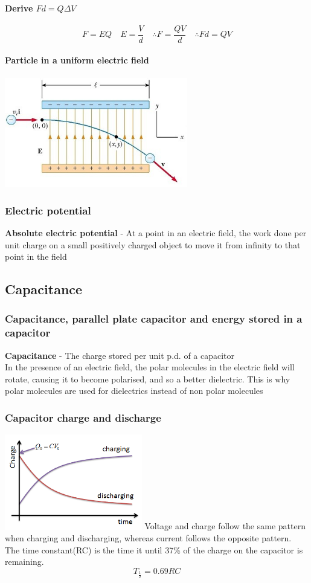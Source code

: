 \documentclass[12pt]{article}
\begin{document}
\paragraph{Derive $Fd=Q\Delta V$}
$$F=EQ \quad E=\frac{V}{d} \quad\therefore F=\frac{QV}{d} \quad\therefore Fd=QV$$
\paragraph{Particle in a uniform electric field}
\begin{center}
\includegraphics[width=8cm]{particle.jpg}
\end{center}
\subsubsection{Electric potential}
\textbf{Absolute electric potential} - At a point in an electric field, the work done per unit charge on a small positively charged object to move it from infinity to that point in the field
\subsection{Capacitance}
\subsubsection{Capacitance, parallel plate capacitor and energy stored in a capacitor}
\textbf{Capacitance} - The charge stored per unit p.d. of a capacitor\\
In the presence of an electric field, the polar molecules in the electric field will rotate, causing it to become polarised, and so a better dielectric. This is why polar molecules are used for dielectrics instead of non polar molecules
\subsubsection{Capacitor charge and discharge}
\includegraphics[width=6cm]{charge.png}
Voltage and charge follow the same pattern when charging and discharging, whereas current follows the opposite pattern.\\
The time constant(RC) is the time it until 37\% of the charge on the capacitor is remaining.
$$T_{\frac{1}{2}}=0.69RC$$
\end{document}
